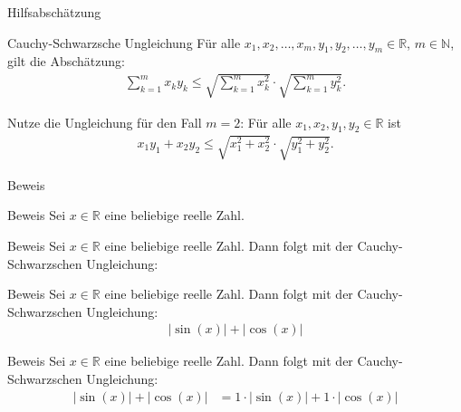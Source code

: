 \documentclass[10pt]{beamer}
\def\bN{\mathbb{N}}
\def\bR{\mathbb{R}}
\begin{document}
\begin{frame}{Hilfsabschätzung}
    \begin{block}{Cauchy-Schwarzsche Ungleichung}
        Für alle \( x_{1}, x_{2}, \ldots, x_{m}, y_{1}, y_{2}, \ldots, y_{m} \in \bR \), \( m \in \bN \), gilt die Abschätzung:
        \begin{align*}
            \sum_{k = 1}^{m} x_{k} y_{k}
            \leq \sqrt{\sum_{k = 1}^{m} x_{k}^{2}} \cdot \sqrt{\sum_{k = 1}^{m} y_{k}^{2}}.
        \end{align*}
    \end{block}
    Nutze die Ungleichung für den Fall \( m = 2 \): Für alle \( x_{1}, x_{2}, y_{1}, y_{2} \in \bR \) ist
    \begin{align*}
        x_{1}y_{1} + x_{2}y_{2}
        \leq \sqrt{x_{1}^{2} + x_{2}^{2}} \cdot \sqrt{y_{1}^{2} + y_{2}^{2}}.
    \end{align*}
\end{frame}



\begin{frame}{Beweis}
    
\end{frame}



\begin{frame}{Beweis}
    Sei \( x \in \bR \) eine beliebige reelle Zahl.
\end{frame}



\begin{frame}{Beweis}
    Sei \( x \in \bR \) eine beliebige reelle Zahl. Dann folgt mit der Cauchy-Schwarzschen Ungleichung:
\end{frame}



\begin{frame}{Beweis}
    Sei \( x \in \bR \) eine beliebige reelle Zahl. Dann folgt mit der Cauchy-Schwarzschen Ungleichung:
    \begin{align*}
        \left\vert \sin\left( x \right) \right\vert + \left\vert \cos\left( x \right) \right\vert
    \end{align*}
\end{frame}



\begin{frame}{Beweis}
    Sei \( x \in \bR \) eine beliebige reelle Zahl. Dann folgt mit der Cauchy-Schwarzschen Ungleichung:
    \begin{align*}
        \left\vert \sin\left( x \right) \right\vert + \left\vert \cos\left( x \right) \right\vert
        & = 1 \cdot \left\vert \sin\left( x \right) \right\vert + 1 \cdot \left\vert \cos\left( x \right) \right\vert
    \end{align*}
\end{frame}
\end{document}
